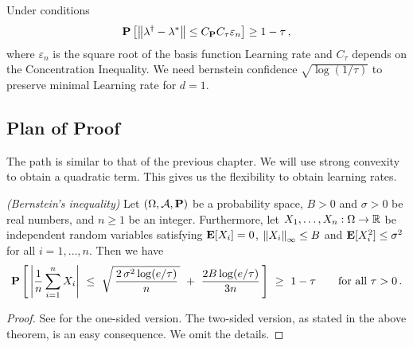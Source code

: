 \begin{theorem}
  Under conditions
  \begin{gather}
    \P
    \left[ 
      \norm{\lambda^\dagger - \lambda^*}
      \le
      C_\P
      C_\tau
      \varepsilon_n
    \right]
    \ge
    1-\tau
    \,,
  \end{gather}
  where 
  $\varepsilon_n$ is the square root of the basis function Learning rate and $C_\tau$ depends on the Concentration Inequality.
  We need bernstein confidence $\sqrt{\log (1/\tau)}$ to preserve minimal Learning rate for $d=1$.
\end{theorem}

\subsection*{Plan of Proof}
The path is similar to that of the previous chapter. 
We will use strong convexity to obtain a quadratic term.
This gives us the flexibility to obtain learning rates.

\begin{theorem}
  \emph{(Bernstein's inequality)}
  Let
  $
  (\Omega,\mathcal{A},\P)
  $ 
  be a probability space, 
  $
  B>0
  $ 
  and
  $
  \sigma>0
  $
  be real numbers,
  and
  $
  n\ge 1
  $
  be an integer.
  Furthermore, 
  let
  $
  X_1,\ldots,X_n
  :
  \Omega
  \to
  \R
  $
  be independent random variables satisfying
  $
  \E[X_i]=0
  $,
  $
  \norm{X_i}_\infty
  \le
  B
  $
  and
  $
  \E[X_i^2]\le \sigma^2
  $
  for all 
  $
  i=1,\ldots,n
  $.
  Then we have
  \begin{gather*}
   \P
    \left[ 
      \,
      \left| 
      \frac{1}{n}
        \sum_{i=1}^{n} 
        X_i
      \right|
      \ 
      \le
      \ 
      \sqrt{
        \,
        \frac{2\,\sigma^2 \log (e/\tau)}{n}
        \,
      }
      \ 
      +
      \
      \frac{2 B \log(e/\tau)}{3n}
      \,
    \right]
    \ 
    \ge
    \ 
    1-\tau
    \qquad
    \text{for all}\ 
    \tau
    >
    0
    \,.
  \end{gather*}
\end{theorem}
\begin{proof}
  See \cite[Theorem~6.12]{Steinwart2008}
  for the one-sided version. 
  The two-sided version, as stated in the above theorem, is an easy consequence. We omit the details.
\end{proof}




